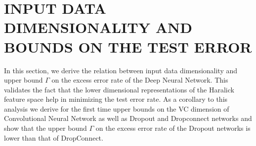 \documentclass[11pt,a4paper]{article}
\begin{document}
\section{INPUT DATA DIMENSIONALITY AND \\ BOUNDS ON THE TEST ERROR} 

In this section, we derive the relation between input data dimensionality and upper bound $\Gamma$ on the excess error rate of the Deep Neural Network. This validates the fact that the lower dimensional representations of the Haralick feature space help in minimizing the test error rate. As a corollary to this analysis we derive for the first time upper bounds on the VC dimension of Convolutional Neural Network as well as Dropout and Dropconnect networks and show that the upper bound $\Gamma$ on the excess error rate of the Dropout networks is lower than that of DropConnect.  
\end{document}
